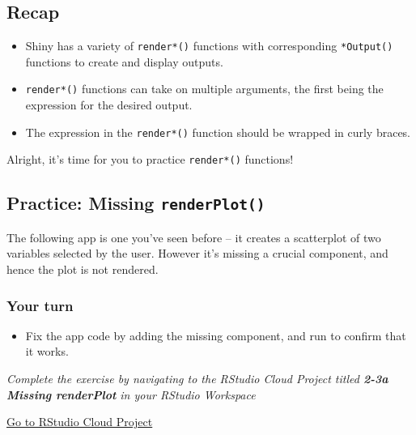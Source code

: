 \documentclass[
  letterpaper,
  DIV=11,
  numbers=noendperiod]{scrreprt}
\providecommand{\tightlist}{%
  \setlength{\itemsep}{0pt}\setlength{\parskip}{0pt}}
\begin{document}
\hypertarget{recap-1}{%
\subsection{Recap}\label{recap-1}}

\begin{itemize}
\item
  Shiny has a variety of \texttt{render*()} functions with corresponding
  \texttt{*Output()} functions to create and display outputs.
\item
  \texttt{render*()} functions can take on multiple arguments, the first
  being the expression for the desired output.
\item
  The expression in the \texttt{render*()} function should be wrapped in
  curly braces.
\end{itemize}

Alright, it's time for you to practice \texttt{render*()} functions!

\hypertarget{practice-missing-renderplot}{%
\subsection{\texorpdfstring{Practice: Missing
\texttt{renderPlot()}}{Practice: Missing renderPlot()}}\label{practice-missing-renderplot}}

The following app is one you've seen before -- it creates a scatterplot
of two variables selected by the user. However it's missing a crucial
component, and hence the plot is not rendered.

\hypertarget{your-turn-10}{%
\subsubsection{Your turn}\label{your-turn-10}}

\begin{itemize}
\tightlist
\item
  Fix the app code by adding the missing component, and run to confirm
  that it works.
\end{itemize}

\emph{Complete the exercise by navigating to the RStudio Cloud Project
titled \textbf{2-3a Missing renderPlot} in your RStudio Workspace}

\href{https://rstudio.cloud/spaces/81721/join?access_code=I4VJaNsKfTqR3Td9hLP7E1nz8\%2FtMg6Xbw9Bgqumv}{
Go to RStudio Cloud Project}
\end{document}
